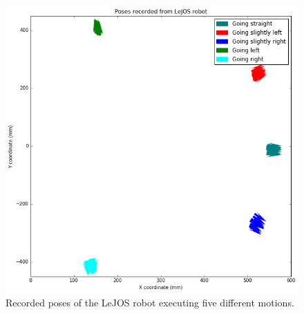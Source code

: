 \documentclass[paper=a4, fontsize=11pt]{scrartcl} %
\begin{document}
    \begin{figure}[h!]
        \begin{center}
            \setlength{\fboxsep}{0.5pt} %
            \setlength{\fboxrule}{0.5pt}
            \includegraphics[width=14cm,fbox]{images/poses_plot_5_experiments.png}
            \caption{Recorded poses of the LeJOS robot executing five different motions.}
        \end{center}
    \end{figure}

    \newpage
\end{document}

